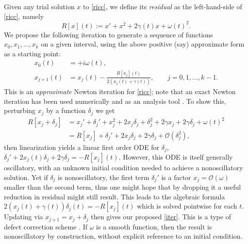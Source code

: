 \documentclass[10pt]{article}
\newcommand{\be}{\begin{equation}}
\newcommand{\ee}{\end{equation}}
\newcommand{\bigO}{{\mathcal O}}
\newcommand{\om}{\omega}
\newcommand{\g}{\gamma}
\newcommand{\Fruzsi}[1]{{\color{blue}#1}}
\begin{document}
Given any trial solution $x$ to \cref{ricc}, we define its \emph{residual}
as the left-hand-side of \cref{ricc}, namely
\be
\label{R}
R[x](t) := x' + x^2 + 2\g(t)x + \om(t)^2.
\ee
We propose the following iteration
to generate a sequence of functions $x_0, x_1, \dots, x_k$
on a given interval,
using the above positive (say) approximate form as a starting point:
\begin{align}
x_0(t) &= +i\om(t), \label{init} \\
x_{j+1}(t) &= x_j(t) - \frac{R[x_j](t)}{2 \left( x_j(t) + \g(t) \right)}, \qquad j=0,1,\dots,k-1. \label{iter}
\end{align}
This is an \emph{approximate} Newton iteration for \cref{ricc}; note that an
exact Newton iteration has been used numerically \cite{krivec2008,krivec2014}
and as an analysis tool \cite{heitman2015}. To show this, perturbing $x_j$ by
a function $\delta_j$ we get
\begin{align}
R[x_j + \delta_j] &= x_j' + \delta_j' + x_j^2 + 2 x_j \delta_j + \delta_j^2 
+ 2\g x_j + 2\g\delta_j + \om(t)^2 \nonumber \\
&= R[x_j] + \delta_j' + 2x_j\delta_j + 2\g\delta_j + \bigO(\delta_j^2), \nonumber
\end{align}
then linearization yields a linear first order ODE for $\delta_j$, 
$\delta_j' + 2x_j(t) \delta_j + 2\g \delta_j  = -R[x_j](t)$.
However, this ODE is itself generally oscillatory,
with an unknown initial condition needed to achieve a nonoscillatory
solution.
Yet if $\delta_j$ is nonoscillatory, the first term $\delta_j'$ is
a factor $x_j = \bigO(\om)$ smaller than the second term, thus
one might hope that by dropping it a useful reduction in residual might
still result.
This leads to the algebraic formula $2\left(x_j(t) + \g(t)\right) \delta_j(t) = -R[x_j](t)$
which is solved pointwise for each $t$. Updating via
$x_{j+1} = x_j + \delta_j$ then gives our proposed \cref{iter}.
This is a type of defect correction scheme \cite{bohmer1984}.
If $\om$ is a smooth function, then
the result is nonoscillatory by construction, without explicit reference
to an initial condition.
\end{document}
